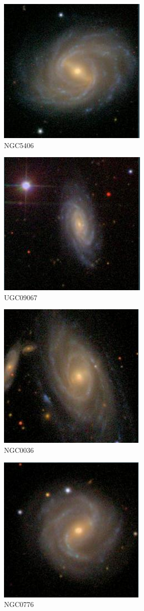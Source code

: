 \documentclass[9pt]{revtex4-1}
\begin{document}
\begin{figure}
\includegraphics[scale=0.3]{NGC5406.png}
\caption{NGC5406}
\end{figure}
\begin{figure}
\includegraphics[scale=0.3]{UGC09067.png}
\caption{UGC09067}
\end{figure}
\begin{figure}
\includegraphics[scale=0.3]{NGC0036.png}
\caption{NGC0036}
\end{figure}
\begin{figure}
\includegraphics[scale=0.3]{NGC0776.png}
\caption{NGC0776}
\end{figure}
\end{document}
